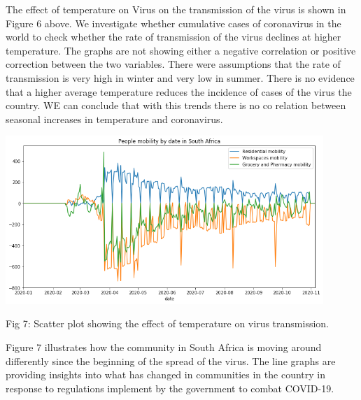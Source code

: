 \documentclass[12pt]{article}
\begin{document}
The effect of temperature on Virus on the transmission of the virus is shown in Figure 6 above.
We investigate whether cumulative  cases of coronavirus in the world to check whether the rate of transmission of the virus declines at higher temperature. The graphs are not showing either a negative correlation or positive correction between the two variables. There were assumptions that the rate of transmission is very high in winter and very low in summer. There is no evidence  that a higher average temperature reduces the incidence of cases of the virus the country. WE can conclude that with this trends there is no co relation between seasonal increases in temperature and coronavirus. 

\centering
\includegraphics[width=0.9\textwidth, inner]{mobility.png}
\caption{Fig 7: Scatter plot showing the effect of temperature on virus transmission.}

Figure 7 illustrates how the community in South Africa is moving around differently since the beginning of the spread of the virus. The line graphs are providing insights into what has changed in communities in the country in response to regulations implement by the government to combat COVID-19. 
\end{document}
